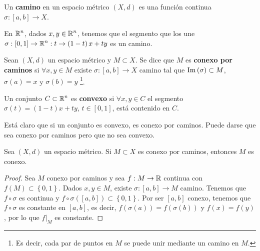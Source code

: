 \begin{definition}[Camino]
	Un \textbf{camino} en un espacio métrico $\displaystyle \left(X,d\right) $ es una función continua $\displaystyle \sigma : [a,b] \to X $. 
\end{definition}
\begin{eg}
	En $\displaystyle \mathbb{R}^{n} $, dados $\displaystyle x,y \in \mathbb{R}^{n} $, tenemos que el segmento que los une $\displaystyle \sigma : [0,1] \to \mathbb{R}^{n} : t \to \left(1-t\right)x +ty $ es un camino. 
\end{eg}
\begin{definition}
	Sean $\displaystyle \left(X,d\right) $ un espacio métrico y $\displaystyle M \subset X $. Se dice que $\displaystyle M $ es \textbf{conexo por caminos} si $\displaystyle \forall x,y \in M $ existe $\displaystyle \sigma : [a,b] \to X $ camino tal que $\displaystyle \operatorname{Im}\left(\sigma \right) \subset M $, $\displaystyle \sigma\left(a\right) = x $ y $\displaystyle \sigma\left(b\right) = y $ \footnote{Es decir, cada par de puntos en $\displaystyle M $ se puede unir mediante un camino en $\displaystyle M $.}.
\end{definition}
\begin{definition}[Convexidad]
	Un conjunto $\displaystyle C \subset \mathbb{R}^{n} $ es \textbf{convexo} si $\displaystyle \forall x,y \in C $ el segmento $\displaystyle \sigma\left(t\right) = \left(1-t\right)x + ty $, $\displaystyle t \in [0,1] $, está contenido en $\displaystyle C $.
\end{definition}
\begin{observation}
Está claro que si un conjunto es convexo, es conexo por caminos. Puede darse que sea conexo por caminos pero que no sea convexo.
\end{observation}
\begin{theorem}
Sea $\displaystyle \left(X,d\right) $ un espacio métrico. Si $\displaystyle M \subset X $ es conexo por caminos, entonces $\displaystyle M $ es conexo.
\end{theorem}
\begin{proof}
	Sea $\displaystyle M $ conexo por caminos y sea $\displaystyle f : M \to \mathbb{R} $ continua con $\displaystyle f\left(M\right) \subset \left\{ 0,1\right\}  $. Dados $\displaystyle x,y \in M $, existe $\displaystyle \sigma : [a,b] \to M $ camino. Tenemos que $\displaystyle f\circ \sigma  $ es continua y $\displaystyle f\circ \sigma\left( \left[a,b\right] \right) \subset \left\{ 0,1\right\}  $. Por ser $\displaystyle [a,b] $ conexo, tenemos que $\displaystyle f\circ \sigma  $ es constante en $\displaystyle \left[a,b\right]  $, es decir, $\displaystyle f\left(\sigma\left(a\right)\right) = f\left(\sigma\left(b\right)\right) $ y $\displaystyle f\left(x\right) = f\left(y\right) $, por lo que $\displaystyle f|_{M} $ es constante.
\end{proof}

